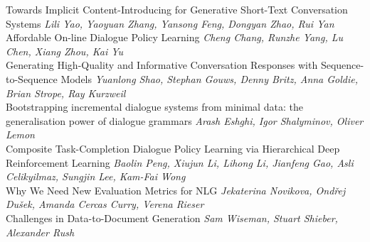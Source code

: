 \documentclass{book}
\begin{document}
    \noindent	Towards Implicit Content-Introducing for Generative Short-Text Conversation Systems \newline 
    {\itshape Lili Yao, Yaoyuan Zhang, Yansong Feng, Dongyan Zhao, Rui Yan} \\
    
    \noindent	Affordable On-line Dialogue Policy Learning \newline 
    {\itshape Cheng Chang, Runzhe Yang, Lu Chen, Xiang Zhou, Kai Yu} \\
    
    \noindent	Generating High-Quality and Informative Conversation Responses with Sequence-to-Sequence Models \newline 
    {\itshape Yuanlong Shao, Stephan Gouws, Denny Britz, Anna Goldie, Brian Strope, Ray Kurzweil} \\
    
    \noindent	Bootstrapping incremental dialogue systems from minimal data: the generalisation power of dialogue grammars \newline 
    {\itshape Arash Eshghi, Igor Shalyminov, Oliver Lemon} \\
    
    \noindent	Composite Task-Completion Dialogue Policy Learning via Hierarchical Deep Reinforcement Learning \newline 
    {\itshape Baolin Peng, Xiujun Li, Lihong Li, Jianfeng Gao, Asli Celikyilmaz, Sungjin Lee, Kam-Fai Wong} \\
    
    \noindent	Why We Need New Evaluation Metrics for NLG \newline 
    {\itshape Jekaterina Novikova, Ondřej Dušek, Amanda Cercas Curry, Verena Rieser} \\
    
    \noindent	Challenges in Data-to-Document Generation \newline 
    {\itshape Sam Wiseman, Stuart Shieber, Alexander Rush} \\
    
\vspace*{\fill}
\end{document}
